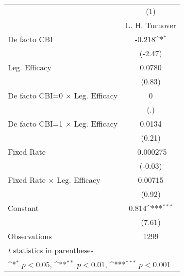 \begin{table}[htbp]\centering
\def\sym#1{\ifmmode^{#1}\else\(^{#1}\)\fi}
\caption{\label{llpFEDF}}
\begin{tabular}{l*{1}{c}}
\toprule
                                        &\multicolumn{1}{c}{(1)}\\
                                        &\multicolumn{1}{c}{L. H. Turnover}\\
\midrule
De facto CBI                            &   -0.218\sym{*}  \\
                                        &  (-2.47)         \\
\addlinespace
Leg. Efficacy                           &   0.0780         \\
                                        &   (0.83)         \\
\addlinespace
De facto CBI=0 $\times$ Leg. Efficacy   &        0         \\
                                        &      (.)         \\
\addlinespace
De facto CBI=1 $\times$ Leg. Efficacy   &   0.0134         \\
                                        &   (0.21)         \\
\addlinespace
Fixed Rate                              &-0.000275         \\
                                        &  (-0.03)         \\
\addlinespace
Fixed Rate $\times$ Leg. Efficacy       &  0.00715         \\
                                        &   (0.92)         \\
\addlinespace
Constant                                &    0.814\sym{***}\\
                                        &   (7.61)         \\
\midrule
Observations                            &     1299         \\
\bottomrule
\multicolumn{2}{l}{\footnotesize \textit{t} statistics in parentheses}\\
\multicolumn{2}{l}{\footnotesize \sym{*} \(p<0.05\), \sym{**} \(p<0.01\), \sym{***} \(p<0.001\)}\\
\end{tabular}
\end{table}
